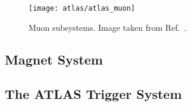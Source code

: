 \begin{figure}[htbp]
  \centering

  \texttt{[image: atlas/atlas\_muon]}

  \caption{Muon subsystems. Image taken from Ref.~\cite{Pequenao:1095929}.}%
  \label{fig:atlas_calorimeters}

\end{figure}

\subsection{Magnet System}

\subsection{The ATLAS Trigger System}

